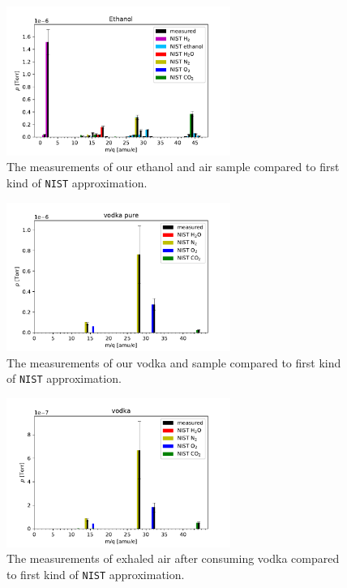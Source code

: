     \begin{figure}[h!]
    \centering
    \includegraphics[width=0.65\textwidth]{Report/DataResultsPlots/ethanol.pdf}
    \caption{The measurements of our ethanol and air sample compared to first kind of \texttt{NIST} approximation.}
    \label{fig:ethanol2}
    \end{figure}
    
    
    \begin{figure}[h!]
    \centering
    \includegraphics[width=0.65\textwidth]{Report/DataResultsPlots/vodka pure.pdf}
    \caption{The measurements of our vodka and sample compared to first kind of \texttt{NIST} approximation.}
    \label{fig:vodka}
    \end{figure}
    
    \begin{figure}[h!]
    \centering
    \includegraphics[width=0.65\textwidth]{Report/DataResultsPlots/vodka.pdf}
    \caption{The measurements of exhaled air after consuming vodka compared to first kind of \texttt{NIST} approximation.}
    \label{fig:vodka_air}
    \end{figure}
    
